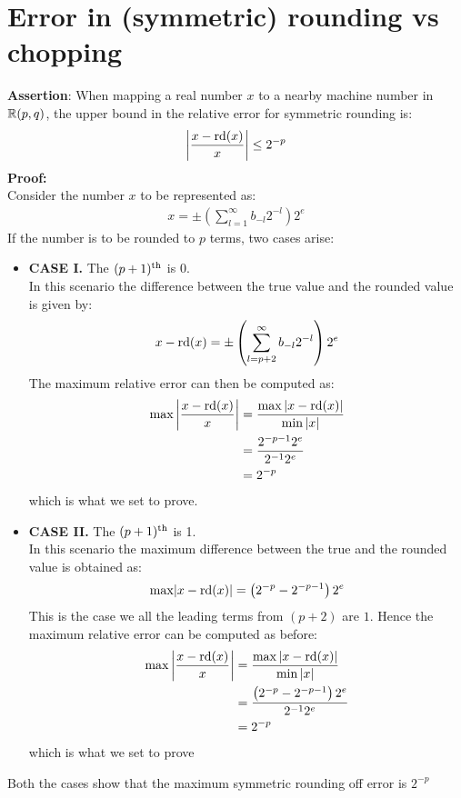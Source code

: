 \section{Error in (symmetric) rounding vs chopping}
\textbf{Assertion}: When mapping a real number $x$ to a nearby machine number in $\mathbb{R}(p,q)$, the upper bound in the relative error for symmetric rounding is:
	\begin{align*}
		\left|\frac{x-\mathrm{rd}(x)}{x}\right|\leq 2^{-p}
	\end{align*}
\textbf{Proof:}\\
Consider the number $x$ to be represented as:
	\begin{align*}
		x = \pm \left(\sum_{l=1}^{\infty} b_{-l}2^{-l}\right)2^e
	\end{align*}
If the number is to be rounded to $p$ terms, two cases arise:
	\begin{itemize}
	\item[] \textbf{CASE I.} The $(p+1)^{\mathrm{th}}$ is 0.\\
	In this scenario the difference between the true value and the rounded value is given by:
			\begin{align*}
				x - \mathrm{rd}(x) = \pm\left(\sum_{l=p+2}^{\infty} b_{-l}2^{-l}\right)2^e
			\end{align*}
			The maximum relative error can then be computed as:
			\begin{align*}
				\mathrm{max}\left|\frac{x-\mathrm{rd}(x)}{x}\right| 	&= \frac{\mathrm{max}\left|x-\mathrm{rd}(x)\right|}{\mathrm{min}\left|x\right|}\\
																&= \frac{2^{-p-1}2^e}{2^{-1}2^e }\\
																&= 2^{-p}
			\end{align*}
			which is what we set to prove.
	\item[] \textbf{CASE II.} The $(p+1)^{\mathrm{th}}$ is 1.\\
	In this scenario the maximum difference between the true and the rounded value is obtained as:
			\begin{align*}
				\mathrm{max}|x - \mathrm{rd}(x)| = \left(2^{-p} - 2^{-p-1}\right)2^e
			\end{align*}
			This is the case we all the leading terms from $(p+2)$ are $1$. Hence the maximum relative error can be computed as before:
			\begin{align*}
				\mathrm{max}\left|\frac{x-\mathrm{rd}(x)}{x}\right| 	&= \frac{\mathrm{max}\left|x-\mathrm{rd}(x)\right|}{\mathrm{min}\left|x\right|}\\
																&= \frac{\left(2^{-p} -2^{-p-1}\right)2^e}{2^{-1}2^e }\\
																&= 2^{-p}
			\end{align*}
			which is what we set to prove
	\end{itemize}
	Both the cases show that the maximum symmetric rounding off error is $2^{-p}$
